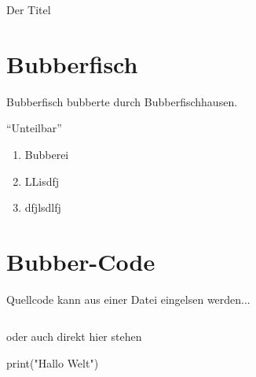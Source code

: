 \documentclass{\VorlagenPfad/coderdojokatext}
\renewcommand{\Titel}{Der Titel}
\begin{document}
\begin{center}
	{\huge \Titel}
\end{center}

\section{Bubberfisch}
Bubberfisch bubberte durch Bubberfischhausen.


\enquote{Unteilbar}

\begin{enumerate}
	\item Bubberei
	\item LLisdfj 
	\item dfjlsdlfj 
\end{enumerate}

\section{Bubber-Code}
Quellcode kann aus einer Datei eingelsen werden...
\inputminted[firstline=5, lastline=8,linenos, breaklines, frame=single, framesep=10pt,framerule=1pt]{python}{../Python/Beispiele/zahlen_raten.py}

oder auch direkt hier stehen

\begin{pythoncode}
print("Hallo Welt")
\end{pythoncode}
\end{document}
